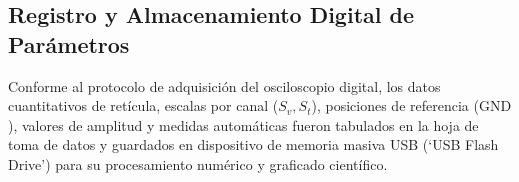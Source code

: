 \subsection{Registro y Almacenamiento Digital de Parámetros}
Conforme al protocolo de adquisición del osciloscopio digital, los datos cuantitativos de retícula, escalas por canal ($S_v, S_t$), posiciones de referencia ($\text{GND}$), valores de amplitud y medidas automáticas fueron tabulados en la hoja de toma de datos y guardados en dispositivo de memoria masiva USB (`USB Flash Drive') para su procesamiento numérico y graficado científico.